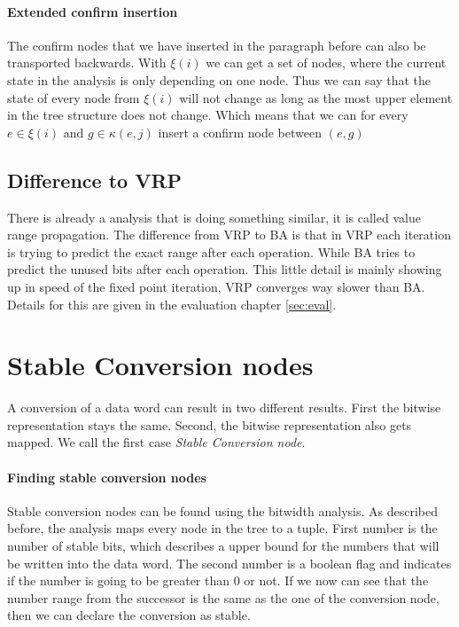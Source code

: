 \paragraph{Extended confirm insertion}
The confirm nodes that we have inserted in the paragraph before can also be transported backwards.
With $\xi(i)$ we can get a set of nodes, where the current state in the analysis is only depending on one node. Thus we can say that the state of every node from $\xi(i)$ will not change as long as the most upper element in the tree structure does not change. Which means that we can for every $e \in \xi(i)$ and $g \in \kappa(e, j)$ insert a confirm node between $(e,g)$

\subsection{Difference to VRP}

There is already a analysis that is doing something similar, it is called value range propagation. The difference from VRP to BA is that in VRP each iteration is trying to predict the exact range after each operation. While BA tries to predict the unused bits after each operation. This little detail is mainly showing up in speed of the fixed point iteration, VRP converges way slower than BA. Details for this are given in the evaluation chapter \ref{sec:eval}.

\section{Stable Conversion nodes}
A conversion of a data word can result in two different results. First the bitwise representation stays the same. Second, the bitwise representation also gets mapped.
We call the first case \textit{Stable Conversion node}.

\paragraph{Finding stable conversion nodes}
Stable conversion nodes can be found using the bitwidth analysis. As described before, the analysis maps every node in the tree to a tuple. First number is the number of stable bits, which describes a upper bound for the numbers that will be written into the data word. The second number is a boolean flag and indicates if the number is going to be greater than 0 or not. If we now can see that the number range from the successor is the same as the one of the conversion node, then we can declare the conversion as stable.

